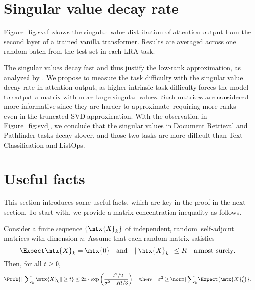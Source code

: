 \documentclass{article}
\begin{document}
\section{Singular value decay rate}





Figure~\ref{fig:svd} shows the singular value distribution of attention output from the second layer of a trained vanilla transformer.
Results are averaged across one random batch from the test set in each LRA task. 

The singular values decay fast and thus justify the low-rank approximation, as analyzed by \citet{DBLP:journals/corr/abs-2006-04768, dong2021attention}.
We propose to measure the task difficulty with the singular value decay rate in attention output, as higher intrinsic task difficulty forces the model to output a matrix with more large singular values.
Such matrices are considered more informative since they are harder to approximate, requiring more ranks even in the truncated SVD approximation.
With the observation in Figure~\ref{fig:svd}, we conclude that the singular values in Document Retrieval and Pathfinder tasks decay slower, and those two tasks are more difficult than Text Classification and ListOps.




\section{Useful facts}
\label{sec:facts}

This section introduces some useful facts, which are key in the proof in the next section. 
To start with, we provide a matrix concentration inequality as follows.
\begin{lemma}
\label{lem:intro-bernstein}
Consider a finite sequence $\{ \mtx{X}_k \}$ of independent, random, self-adjoint matrices with dimension $n$.  
Assume that each random matrix satisfies
$$
\Expect \mtx{X}_k = \mtx{0}
\quad\text{and}\quad
\| \mtx{X}_k \| \leq R
\quad\text{almost surely}.
$$
Then, for all $t \geq 0$,
$$
\Prob{ \| \sum\nolimits_k \mtx{X}_k \| \geq t }
	\leq 2n \cdot \exp\left( \frac{-t^2/2}{\sigma^2 + Rt/3} \right)
	\quad\text{where}\quad
	\sigma^2 \geq \norm{ \sum\nolimits_k \Expect \big(\mtx{X}_k^2 \big) }.
$$
\end{lemma}
\end{document}
